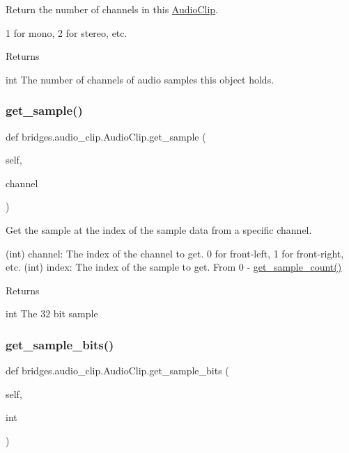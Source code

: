 Return the number of channels in this \hyperlink{classbridges_1_1audio__clip_1_1_audio_clip}{Audio\+Clip}. 

1 for mono, 2 for stereo, etc. \begin{DoxyReturn}{Returns}


int The number of channels of audio samples this object holds. 
\end{DoxyReturn}
\mbox{\label{classbridges_1_1audio__clip_1_1_audio_clip_a6ebead4b2cbd7c5d39c3d67775013ac4}} 
\subsubsection{\texorpdfstring{get\+\_\+sample()}{get\_sample()}}
{\footnotesize\ttfamily def bridges.\+audio\+\_\+clip.\+Audio\+Clip.\+get\+\_\+sample (\begin{DoxyParamCaption}\item[{}]{self,  }\item[{}]{channel }\end{DoxyParamCaption})}



Get the sample at the index of the sample data from a specific channel. 

(int) channel\+: The index of the channel to get. 0 for front-\/left, 1 for front-\/right, etc. (int) index\+: The index of the sample to get. From 0 -\/ \hyperlink{classbridges_1_1audio__clip_1_1_audio_clip_ace0227160e6743e8fd19c803af81d474}{get\+\_\+sample\+\_\+count()} \begin{DoxyReturn}{Returns}


int The 32 bit sample 
\end{DoxyReturn}
\mbox{\label{classbridges_1_1audio__clip_1_1_audio_clip_a8dc41d20f5c06e83f7aea326072ef32e}} 
\subsubsection{\texorpdfstring{get\+\_\+sample\+\_\+bits()}{get\_sample\_bits()}}
{\footnotesize\ttfamily def bridges.\+audio\+\_\+clip.\+Audio\+Clip.\+get\+\_\+sample\+\_\+bits (\begin{DoxyParamCaption}\item[{}]{self,  }\item[{}]{int }\end{DoxyParamCaption})}




